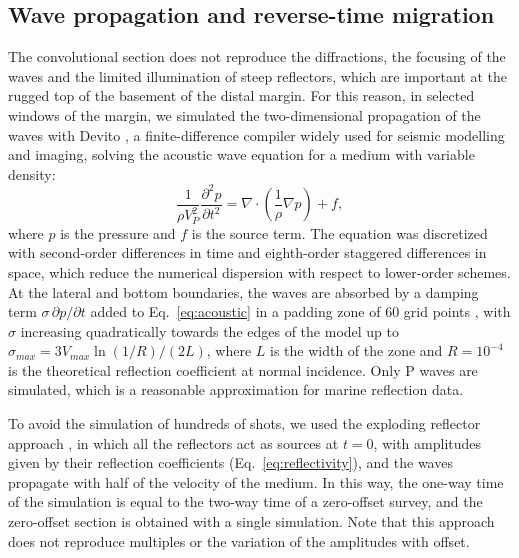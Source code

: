 \subsection{Wave propagation and reverse-time migration}
\label{sec:seismic_fd}

The convolutional section does not reproduce the diffractions, the focusing of the waves and
the limited illumination of steep reflectors, which are important at the rugged top of the
basement of the distal margin. For this reason, in selected windows of the margin, we
simulated the two-dimensional propagation of the waves with Devito
\citep{Louboutin2019}, a finite-difference compiler widely used for seismic modelling and
imaging, solving the acoustic wave equation for a medium with variable density:
\begin{equation}
  \frac{1}{\rho V_P^2} \frac{\partial^2 p}{\partial t^2}
  = \nabla \cdot \left(\frac{1}{\rho} \nabla p\right) + f,
  \label{eq:acoustic}
\end{equation}
where $p$ is the pressure and $f$ is the source term. The equation was discretized with
second-order differences in time and eighth-order staggered differences in space, which
reduce the numerical dispersion with respect to lower-order schemes. At the lateral and
bottom boundaries, the waves are absorbed by a damping term $\sigma\,\partial p/\partial t$
added to Eq.~\ref{eq:acoustic} in a padding zone of 60 grid points
\citep{Cerjan1985, Sochacki1987}, with $\sigma$ increasing quadratically towards the edges
of the model up to $\sigma_{max} = 3 V_{max} \ln(1/R) / (2L)$, where $L$ is the width of the
zone and $R = 10^{-4}$ is the theoretical reflection coefficient at normal incidence. Only P
waves are simulated, which is a reasonable approximation for marine reflection data.

To avoid the simulation of hundreds of shots, we used the exploding reflector approach
\citep{Loewenthal1976}, in which all the reflectors act as sources at $t = 0$, with amplitudes
given by their reflection coefficients (Eq.~\ref{eq:reflectivity}), and the waves propagate
with half of the velocity of the medium. In this way, the one-way time of the simulation is
equal to the two-way time of a zero-offset survey, and the zero-offset section is obtained
with a single simulation. Note that this approach does not reproduce multiples or the
variation of the amplitudes with offset.

